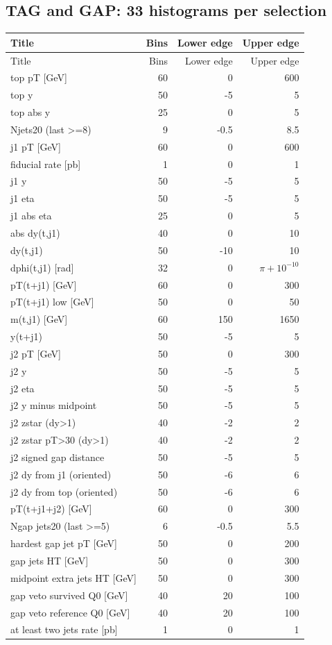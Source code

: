 \documentclass[11pt,a4paper]{article}
\begin{document}
\subsection*{TAG and GAP: 33 histograms per selection}
\begin{longtable}{@{}L{88mm}rrr@{}}
\toprule
Title & Bins & Lower edge & Upper edge\\
\midrule
\endfirsthead
\toprule
Title & Bins & Lower edge & Upper edge\\
\midrule
\endhead
\bottomrule
\endfoot
top pT [GeV] & 60 & 0 & 600 \\
top y & 50 & -5 & 5 \\
top abs y & 25 & 0 & 5 \\
Njets20 (last >=8) & 9 & -0.5 & 8.5 \\
j1 pT [GeV] & 60 & 0 & 600 \\
fiducial rate [pb] & 1 & 0 & 1 \\
j1 y & 50 & -5 & 5 \\
j1 eta & 50 & -5 & 5 \\
j1 abs eta & 25 & 0 & 5 \\
abs dy(t,j1) & 40 & 0 & 10 \\
dy(t,j1) & 50 & -10 & 10 \\
dphi(t,j1) [rad] & 32 & 0 & $\pi+10^{-10}$ \\
pT(t+j1) [GeV] & 60 & 0 & 300 \\
pT(t+j1) low [GeV] & 50 & 0 & 50 \\
m(t,j1) [GeV] & 60 & 150 & 1650 \\
y(t+j1) & 50 & -5 & 5 \\
j2 pT [GeV] & 50 & 0 & 300 \\
j2 y & 50 & -5 & 5 \\
j2 eta & 50 & -5 & 5 \\
j2 y minus midpoint & 50 & -5 & 5 \\
j2 zstar (dy>1) & 40 & -2 & 2 \\
j2 zstar pT>30 (dy>1) & 40 & -2 & 2 \\
j2 signed gap distance & 50 & -5 & 5 \\
j2 dy from j1 (oriented) & 50 & -6 & 6 \\
j2 dy from top (oriented) & 50 & -6 & 6 \\
pT(t+j1+j2) [GeV] & 60 & 0 & 300 \\
Ngap jets20 (last >=5) & 6 & -0.5 & 5.5 \\
hardest gap jet pT [GeV] & 50 & 0 & 200 \\
gap jets HT [GeV] & 50 & 0 & 300 \\
midpoint extra jets HT [GeV] & 50 & 0 & 300 \\
gap veto survived Q0 [GeV] & 40 & 20 & 100 \\
gap veto reference Q0 [GeV] & 40 & 20 & 100 \\
at least two jets rate [pb] & 1 & 0 & 1 \\
\end{longtable}
\end{document}
